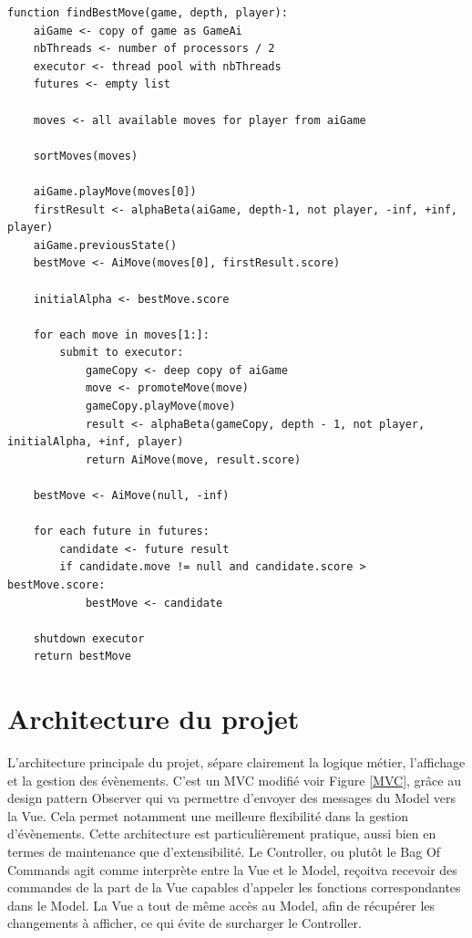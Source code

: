 \documentclass{article}
\begin{document}
\begin{lstlisting}[label={AlphaBetaParallel}, caption={AlphaBeta version parallèle - pseudo-code}]
function findBestMove(game, depth, player):
    aiGame <- copy of game as GameAi
    nbThreads <- number of processors / 2
    executor <- thread pool with nbThreads
    futures <- empty list

    moves <- all available moves for player from aiGame

    sortMoves(moves)

    aiGame.playMove(moves[0])
    firstResult <- alphaBeta(aiGame, depth-1, not player, -inf, +inf, player)
    aiGame.previousState()
    bestMove <- AiMove(moves[0], firstResult.score)

    initialAlpha <- bestMove.score

    for each move in moves[1:]:
        submit to executor:
            gameCopy <- deep copy of aiGame
            move <- promoteMove(move)
            gameCopy.playMove(move)
            result <- alphaBeta(gameCopy, depth - 1, not player, initialAlpha, +inf, player)
            return AiMove(move, result.score)

    bestMove <- AiMove(null, -inf)

    for each future in futures:
        candidate <- future result
        if candidate.move != null and candidate.score > bestMove.score:
            bestMove <- candidate

    shutdown executor
    return bestMove
    \end{lstlisting}
    \FloatBarrier

\section{Architecture du projet}
L'architecture principale du projet, sépare clairement la logique métier, l'affichage et la gestion des évènements. C'est un MVC modifié voir Figure \ref{MVC},
grâce au design pattern Observer qui va permettre d'envoyer des messages du Model vers la Vue. Cela permet notamment une meilleure flexibilité dans la
gestion d'évènements.
Cette architecture est particulièrement pratique, aussi bien en termes de maintenance que d'extensibilité.
Le Controller, ou plutôt le Bag Of Commands agit comme interprète entre la Vue et le Model, reçoitva recevoir des commandes de la part de la Vue capables d'appeler les fonctions correspondantes dans le Model.
La Vue a tout de même accès au Model, afin de récupérer les changements à afficher, ce qui évite de surcharger le Controller.
\end{document}
